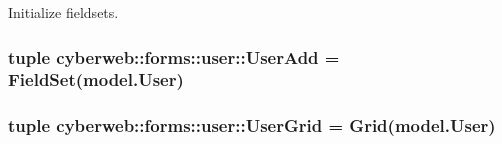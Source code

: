 \-Initialize fieldsets. 

\hypertarget{namespacecyberweb_1_1forms_1_1user_a329342398b686717cbd55a6af7c49883}{
\subsubsection[{\-User\-Add}]{\setlength{\rightskip}{0pt plus 5cm}tuple {\bf cyberweb\-::forms\-::user\-::\-User\-Add} = \-Field\-Set({\bf model.\-User})}}\label{namespacecyberweb_1_1forms_1_1user_a329342398b686717cbd55a6af7c49883}
\hypertarget{namespacecyberweb_1_1forms_1_1user_ab34e85b7ea9b664ef17120f7782e97bb}{
\subsubsection[{\-User\-Grid}]{\setlength{\rightskip}{0pt plus 5cm}tuple {\bf cyberweb\-::forms\-::user\-::\-User\-Grid} = \-Grid({\bf model.\-User})}}\label{namespacecyberweb_1_1forms_1_1user_ab34e85b7ea9b664ef17120f7782e97bb}
